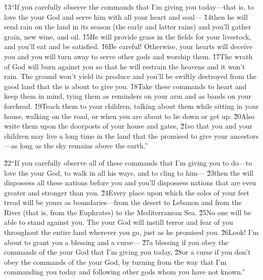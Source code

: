 \v{13}``If you carefully observe the commands that I'm giving you today---that is, to love the  your God and serve him with all your heart and soul--- \v{14}then he will send rain on the land in its season (the early and latter rains) and you'll gather grain, new wine, and oil. \v{15}He will provide grass in the fields for your livestock, and you'll eat and be satisfied. \v{16}Be careful! Otherwise, your hearts will deceive you and you will turn away to serve other gods and worship them. \v{17}The wrath of God will burn against you so that he will restrain the heavens and it won't rain. The ground won't yield its produce and you'll be swiftly destroyed from the good land that the  is about to give you. \v{18}Take these commands to heart and keep them in mind, tying them as reminders on your arm and as bands on your forehead. \v{19}Teach them to your children, talking about them while sitting in your house, walking on the road, or when you are about to lie down or get up. \v{20}Also write them upon the doorposts of your house and gates, \v{21}so that you and your children may live a long time in the land that the  promised to give your ancestors---as long as the sky remains above the earth.''

\v{22}``If you carefully observe all of these commands that I'm giving you to do---to love the  your God, to walk in all his ways, and to cling to him--- \v{23}then the  will dispossess all these nations before you and you'll dispossess nations that are even greater and stronger than you. \v{24}Every place upon which the soles of your feet tread will be yours as boundaries---from the desert to Lebanon and from the River (that is, from the Euphrates) to the Mediterranean Sea. \v{25}No one will be able to stand against you. The  your God will instill terror and fear of you throughout the entire land wherever you go, just as he promised you. \v{26}Look! I'm about to grant you a blessing and a curse--- \v{27}a blessing if you obey the commands of the  your God that I'm giving you today, \v{28}or a curse if you don't obey the commands of the  your God, by turning from the way that I'm commanding you today and following other gods whom you have not known.''

